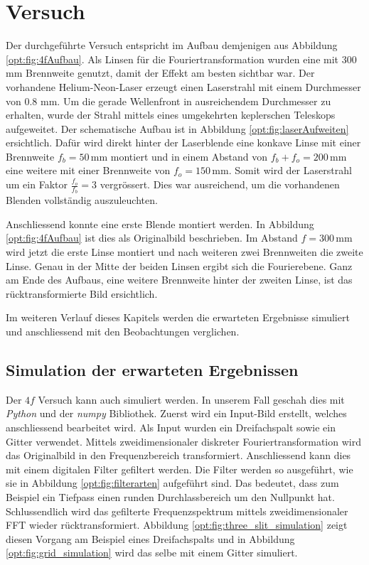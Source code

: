 %
%
%
%
\section{Versuch
  \label{opt:section:versuch}}

Der durchgeführte Versuch entspricht im Aufbau demjenigen aus Abbildung \ref{opt:fig:4fAufbau}.
Als Linsen für die Fouriertransformation wurden eine mit 300 mm Brennweite genutzt, damit der Effekt am besten sichtbar war.
Der vorhandene Helium-Neon-Laser erzeugt einen Laserstrahl mit einem Durchmesser von $0.8$ mm.
Um die gerade Wellenfront in ausreichendem Durchmesser zu erhalten, wurde der Strahl mittels eines umgekehrten keplerschen Teleskops aufgeweitet.
Der schematische Aufbau ist in Abbildung \ref{opt:fig:laserAufweiten} ersichtlich.
Dafür wird direkt hinter der Laserblende eine konkave Linse mit einer Brennweite $f_b = 50\,\text{mm}$ montiert 
und in einem Abstand von $f_b + f_o = 200\,\text{mm}$ eine weitere mit einer Brennweite von $f_o = 150\,\text{mm}$.
Somit wird der Laserstrahl um ein Faktor $\frac{f_o}{f_b} = 3$ vergrössert.
Dies war ausreichend, um die vorhandenen Blenden vollständig auszuleuchten.

Anschliessend konnte eine erste Blende montiert werden.
In Abbildung \ref{opt:fig:4fAufbau} ist dies als Originalbild beschrieben.
Im Abstand $f=300\,\text{mm}$ wird jetzt die erste Linse montiert und nach weiteren zwei Brennweiten die zweite Linse.
Genau in der Mitte der beiden Linsen ergibt sich die Fourierebene.
Ganz am Ende des Aufbaus, eine weitere Brennweite hinter der zweiten Linse, ist das rücktransformierte Bild ersichtlich.

Im weiteren Verlauf dieses Kapitels werden die erwarteten Ergebnisse simuliert und anschliessend mit den Beobachtungen verglichen.

\subsection{Simulation der erwarteten Ergebnissen}
Der $4f$ Versuch kann auch simuliert werden.
In unserem Fall geschah dies mit \emph{Python} und der \emph{numpy} Bibliothek.
Zuerst wird ein Input-Bild erstellt, welches anschliessend bearbeitet wird.
Als Input wurden ein Dreifachspalt sowie ein Gitter verwendet.
Mittels zweidimensionaler diskreter Fouriertransformation wird das Originalbild in den Frequenzbereich transformiert.
Anschliessend kann dies mit einem digitalen Filter gefiltert werden.
Die Filter werden so ausgeführt, wie sie in Abbildung \ref{opt:fig:filterarten} aufgeführt sind.
Das bedeutet, dass zum Beispiel ein Tiefpass einen runden Durchlassbereich um den Nullpunkt hat.
Schlussendlich wird das gefilterte Frequenzspektrum mittels zweidimensionaler FFT wieder rücktransformiert.
Abbildung \ref{opt:fig:three_slit_simulation} zeigt diesen Vorgang am Beispiel eines Dreifachspalts und 
in Abbildung \ref{opt:fig:grid_simulation} wird das selbe mit einem Gitter simuliert.

